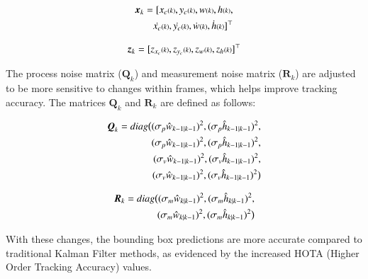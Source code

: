 \begin{equation}
  \begin{split}
    \vb*{x}_k = [x_{c}{\scriptstyle(k)}, y_{c}{\scriptstyle(k)}, w{\scriptstyle(k)}, h{\scriptstyle(k)}, \\        
    \dot{x_{c}}{\scriptstyle(k)}, \dot{y_{c}}{\scriptstyle(k)}, \dot{w}{\scriptstyle(k)}, \dot{h}{\scriptstyle(k)}]^\top
  \end{split}
\end{equation}

\begin{equation}
  \vb*{z}_k = [z_{x_c}{\scriptstyle(k)}, z_{y_c}{\scriptstyle(k)}, z_{w}{\scriptstyle(k)}, z_{h}{\scriptstyle(k)}]^\top
\end{equation}

The process noise matrix ($\mathbf{Q}_k$) and measurement noise matrix ($\mathbf{R}_k$) are adjusted to be more sensitive to changes within frames, which helps improve tracking accuracy. The matrices $\mathbf{Q}_k$ and $\mathbf{R}_k$ are defined as follows:

\begin{equation}
  \begin{split}
    \vb*{Q}_k = diag\big{(} (\sigma_{p} \hat{w}_{k-1|k-1})^2, (\sigma_{p} \hat{h}_{k-1|k-1})^2, \\
    (\sigma_{p} \hat{w}_{k-1|k-1})^2, (\sigma_{p} \hat{h}_{k-1|k-1})^2, \\
    (\sigma_{v} \hat{w}_{k-1|k-1})^2, (\sigma_{v} \hat{h}_{k-1|k-1})^2, \\ 
    (\sigma_{v} \hat{w}_{k-1|k-1})^2 ,(\sigma_{v} \hat{h}_{k-1|k-1})^2\big{)}
  \end{split}
\end{equation}

\begin{equation}
  \begin{split}
      \vb*{R}_k = diag\big{(}(\sigma_{m} \hat{w}_{k|k-1})^2, (\sigma_{m} \hat{h}_{k|k-1})^2, \\
      (\sigma_{m} \hat{w}_{k|k-1})^2, (\sigma_{m} \hat{h}_{k|k-1})^2\big{)} 
  \end{split}
\end{equation}

With these changes, the bounding box predictions are more accurate compared to traditional Kalman Filter methods, as evidenced by the increased HOTA (Higher Order Tracking Accuracy) values.


